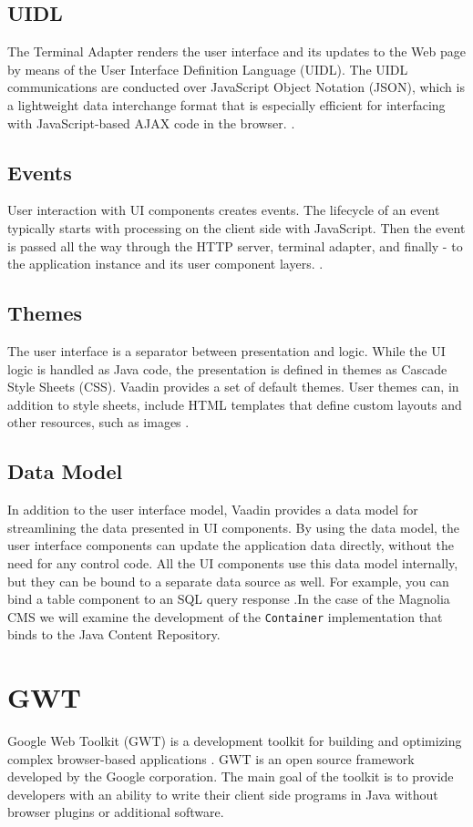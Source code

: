 \subsection{UIDL} The Terminal Adapter renders the user interface and its updates
to the Web page by means of the User Interface Definition Language (UIDL). The
UIDL communications are conducted over JavaScript Object Notation (JSON), which
is a lightweight data interchange format that is especially efficient for
interfacing with JavaScript-based AJAX code in the browser. \cite{BoV}.

\subsection{Events} User interaction with UI components creates events. The
lifecycle of an event typically starts with processing on the client side with
JavaScript. Then the event is passed all the way through the HTTP server,
terminal adapter, and finally - to the application instance and its user
component layers. \cite{BoV}.

\subsection{Themes} The user interface is a separator between presentation and
logic. While the UI logic is handled as Java code, the presentation is defined
in themes as Cascade Style Sheets (CSS). Vaadin provides a set of default
themes.
User themes can, in addition to style sheets, include HTML templates that define
custom layouts and other resources, such as images \cite{BoV}.
 

\subsection{Data Model} In addition to the user interface model, Vaadin provides
a data model for streamlining the data presented in UI components. By using the
data model, the user interface components can update the application data
directly, without the need for any control code. All the UI components use this
data model internally, but they can be bound to a separate data source as well.
For example, you can bind a table component to an SQL 
query response \cite{BoV}.In the case of the Magnolia CMS we will examine the
development of the \texttt{Container} implementation that binds to the Java Content
Repository.


\section{GWT}
Google Web Toolkit (GWT) is a development toolkit for building and optimizing
complex browser-based applications \cite{GWT}.
GWT is an open source framework developed by the Google corporation. The main
goal of the toolkit is to provide developers with an ability to write their
client side programs in Java without browser plugins or additional software.

